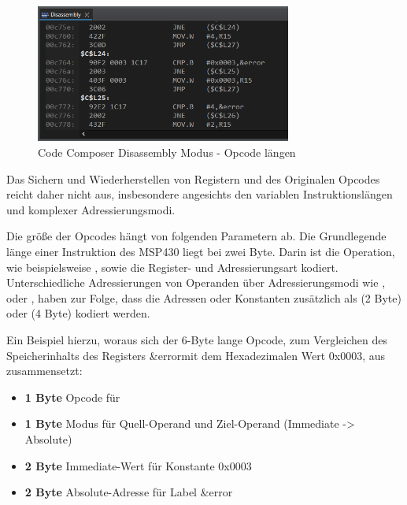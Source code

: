 \begin{figure}[h!]
	\centering
	\includegraphics[width=0.75\textwidth]{../Bilder/OpcodeLaengen.png}
	\caption{Code Composer Disassembly Modus - Opcode l\"angen}
	\label{fig:DisassemblyOpcodeLaengen}
\end{figure}

Das Sichern und Wiederherstellen von Registern und des Originalen Opcodes reicht daher nicht aus, insbesondere angesichts den variablen Instruktionsl\"angen und komplexer Adressierungsmodi. 

Die gr\"o{\ss}e der Opcodes h\"angt von folgenden Parametern ab. Die Grundlegende l\"ange einer Instruktion des MSP430 liegt bei zwei Byte. Darin ist die Operation, wie beispielsweise , sowie die Register- und Adressierungsart kodiert. Unterschiedliche Adressierungen von Operanden \"uber Adressierungsmodi wie \glqq {}\grqq , \glqq {} \grqq oder \glqq {}\grqq, haben zur Folge, dass die Adressen oder Konstanten zus\"atzlich als  (2 Byte) oder  (4 Byte) kodiert werden. 

Ein Beispiel hierzu, woraus sich der 6-Byte lange Opcode, zum Vergleichen des Speicherinhalts des Registers \glqq \&error\grqq  mit dem Hexadezimalen Wert \glqq 0x0003\grqq, aus  zusammensetzt:
\\\textbf{}
\begin{itemize}
	\item \textbf{1 Byte} Opcode f\"ur 
	\item \textbf{1 Byte} Modus f\"ur Quell-Operand und Ziel-Operand (Immediate -> Absolute)
	\item \textbf{2 Byte} Immediate-Wert f\"ur Konstante \glqq 0x0003\grqq
	\item \textbf{2 Byte} Absolute-Adresse f\"ur Label \glqq \&error\grqq
\end{itemize}

